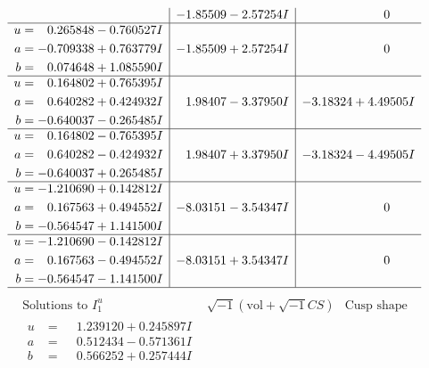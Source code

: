 \documentclass[1p]{elsarticle_modified}
\theoremstyle{definition}
\newcommand{\I}{\sqrt{-1}}
\begin{document}
$$\begin{array}{c|c|c}
 & -1.85509 - 2.57254 I & \phantom{-0.000000 } 0 \\ \hline\begin{aligned}
u &= \phantom{-}0.265848 - 0.760527 I \\
a &= -0.709338 + 0.763779 I \\
b &= \phantom{-}0.074648 + 1.085590 I\end{aligned}
 & -1.85509 + 2.57254 I & \phantom{-0.000000 } 0 \\ \hline\begin{aligned}
u &= \phantom{-}0.164802 + 0.765395 I \\
a &= \phantom{-}0.640282 + 0.424932 I \\
b &= -0.640037 - 0.265485 I\end{aligned}
 & \phantom{-}1.98407 - 3.37950 I & -3.18324 + 4.49505 I \\ \hline\begin{aligned}
u &= \phantom{-}0.164802 - 0.765395 I \\
a &= \phantom{-}0.640282 - 0.424932 I \\
b &= -0.640037 + 0.265485 I\end{aligned}
 & \phantom{-}1.98407 + 3.37950 I & -3.18324 - 4.49505 I \\ \hline\begin{aligned}
u &= -1.210690 + 0.142812 I \\
a &= \phantom{-}0.167563 + 0.494552 I \\
b &= -0.564547 + 1.141500 I\end{aligned}
 & -8.03151 - 3.54347 I & \phantom{-0.000000 } 0 \\ \hline\begin{aligned}
u &= -1.210690 - 0.142812 I \\
a &= \phantom{-}0.167563 - 0.494552 I \\
b &= -0.564547 - 1.141500 I\end{aligned}
 & -8.03151 + 3.54347 I & \phantom{-0.000000 } 0\\
 \hline 
 \end{array}$$\newpage$$\begin{array}{c|c|c}  
\text{Solutions to }I^u_{1}& \I (\text{vol} + \sqrt{-1}CS) & \text{Cusp shape}\\
 \hline 
\begin{aligned}
u &= \phantom{-}1.239120 + 0.245897 I \\
a &= \phantom{-}0.512434 - 0.571361 I \\
b &= \phantom{-}0.566252 + 0.257444 I\end{aligned}

\end{array}$$
\end{document}
